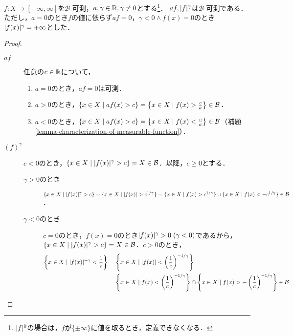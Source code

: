 \documentclass[uplatex, dvipdfmx]{jsreport}
\renewcommand{\B}{\mathcal{B}}
\begin{document}
\begin{proposition}\label{prop-measurable-function-closed-uunder-scaling-and-power}
    $f:X\to[-\infty,\infty]$を$\B$-可測，$a,\gamma\in\mathbb{R},\gamma\ne 0$とする\footnote{$\lvert f\rvert^0$の場合は，$f$が$\{\pm\infty\}$に値を取るとき，定義できなくなる．}．
    $af,\lvert f\rvert^\gamma$は$\B$-可測である．
    ただし，$a=0$のとき$f$の値に依らず$af=0$，$\gamma<0\land f(x)=0$のとき$\lvert f(x)\rvert^\gamma=+\infty$とした．
\end{proposition}
\begin{proof}\mbox{}
    \begin{description}
        \item[$af$] 任意の$c\in\mathbb{R}$について，\begin{enumerate}
            \item $a=0$のとき，$af=0$は可測．
            \item $a>0$のとき，$\{x\in X\mid af(x)>c\}=\Brace{x\in X\mid f(x)>\frac{c}{a}}\in\B$．
            \item $a<0$のとき，$\{x\in X\mid af(x)>c\}=\Brace{x\in X\mid f(x)<\frac{c}{a}}\in\B$（補題\ref{lemma-characterization-of-measurable-function}）．
        \end{enumerate}
        \item[$(f)^\gamma$] $c<0$のとき，$\{x\in X\mid \abs{f(x)}^\gamma>c\}=X\in\B$．以降，$c\ge 0$とする．
        \begin{description}
            \item[$\gamma>0$のとき] $\{x\in X\mid \abs{f(x)}^\gamma>c\}=\{x\in X\mid \abs{f(x)}>c^{1/\gamma}\}=\{x\in X\mid f(x)>c^{1/\gamma}\}\cup\{x\in X\mid f(x)<-c^{1/\gamma}\}\in\B$．
            \item[$\gamma<0$のとき] $c=0$のとき，$f(x)=0$のとき$\lvert f(x)\rvert^\gamma>0\;(\gamma<0)$であるから，$\{x\in X\mid \abs{f(x)}^\gamma>c\}=X\in\B$．$c>0$のとき，
            \begin{align*}
                \Brace{x\in X\mid\abs{f(x)}^{-\gamma}<\frac{1}{c}}&=\Brace{x\in X\mid\abs{f(x)}<\paren{\frac{1}{c}}^{-1/\gamma}}\\
                &=\Brace{x\in X\mid f(x)<\paren{\frac{1}{c}}^{-1/\gamma}}\cap\Brace{x\in X\mid f(x)>-\paren{\frac{1}{c}}^{-1/\gamma}}\in\B
            \end{align*}
        \end{description}
    \end{description}
\end{proof}
\end{document}

